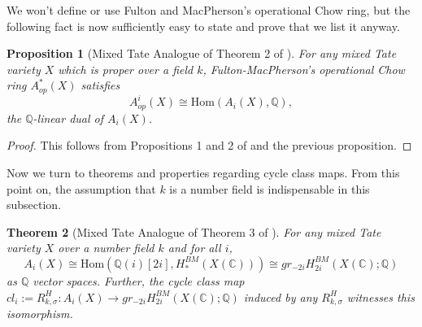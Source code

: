 \documentclass[11pt]{amsart}
\newtheorem{thm}{Theorem}[section]
\newtheorem{prop}[thm]{Proposition}
\theoremstyle{definition}
\theoremstyle{remark}
\newcommand{\Hom}{\mathrm{Hom}}
\numberwithin{equation}{section}
\begin{document}
We won't define or use Fulton and MacPherson's operational Chow ring, but the following fact is now sufficiently easy to state and prove that we list it anyway.

\begin{prop}[Mixed Tate Analogue of Theorem 2 of \cite{totaro2014chow}] For any mixed Tate variety $X$ which is proper over a field $k$, Fulton-MacPherson's operational Chow ring $A_{op}^*(X)$ satisfies \begin{equation}
    A_{op}^i(X) \cong \Hom(A_i(X), \mathbb{Q}),
\end{equation}
the $\mathbb{Q}$-linear dual of $A_i(X)$.
\end{prop}

\begin{proof}
    This follows from Propositions 1 and 2 of \cite{totaro2014chow} and the previous proposition.
\end{proof}

Now we turn to theorems and properties regarding cycle class maps. From this point on, the assumption that $k$ is a number field is indispensable in this subsection.

\begin{thm}[Mixed Tate Analogue of Theorem 3 of \cite{totaro2014chow}]\label{cycle class iso}
    For any mixed Tate variety $X$ over a number field $k$ and for all $i$, \begin{equation}
        A_i(X) \cong \Hom(\mathbb{Q}(i)[2i], H_*^{BM}(X(\mathbb{C}))) \cong gr_{-2i}H_{2i}^{BM}(X(\mathbb{C}); \mathbb{Q})
    \end{equation} \noindent as $\mathbb{Q}$ vector spaces. Further, the cycle class map $cl_i := R^H_{k, \sigma}: A_i(X) \rightarrow gr_{-2i}H_{2i}^{BM}(X(\mathbb{C});\mathbb{Q})$ induced by any $R^H_{k, \sigma}$ witnesses this isomorphism.
\end{thm}
\end{document}
